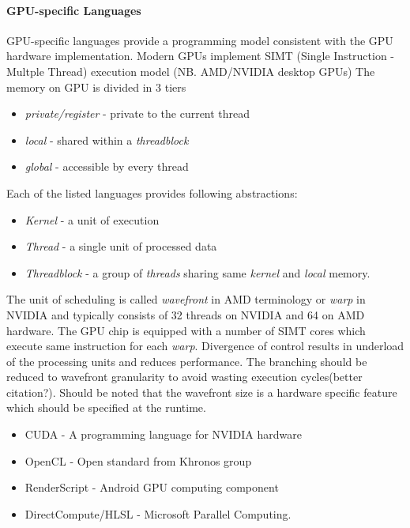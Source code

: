 \documentclass[]{report}
\begin{document}
\paragraph*{GPU-specific Languages}
 GPU-specific languages provide a programming model consistent with the GPU hardware implementation. 
 Modern GPUs implement SIMT (Single Instruction - Multple Thread) execution model (NB. AMD/NVIDIA desktop GPUs) 
 The memory on GPU is divided in 3 tiers 
\begin{itemize}
  	\item \textit{private/register} - private to the current thread
  	\item \textit{local} - shared within a \textit{threadblock}
  	\item \textit{global} - accessible by every thread
\end{itemize}
Each of the listed languages provides following abstractions:
 \begin{itemize}
 	\item \textit{Kernel} - a unit of execution
 	\item \textit{Thread} - a single unit of processed data 
 	\item \textit{Threadblock} - a group of \textit{threads} sharing same \textit{kernel} and \textit{local} memory.
 \end{itemize}

The unit of scheduling is called \textit{wavefront} in AMD terminology or \textit{warp} in NVIDIA and typically consists of 32 threads on NVIDIA and 64 on AMD hardware. The GPU chip is equipped with a number of SIMT cores which execute same instruction for each \textit{warp}. 
Divergence of control results in underload of the processing units and reduces performance. The branching should be reduced to wavefront granularity to avoid wasting execution cycles\cite{megakernel}(better citation?). Should be noted that the wavefront size is a hardware specific feature which should be specified at the runtime.
  
\begin{itemize}
\item CUDA - A programming language for NVIDIA hardware
\item OpenCL - Open standard from Khronos group
\item RenderScript - Android GPU computing component
\item DirectCompute/HLSL - Microsoft Parallel Computing.
\end{itemize}
\end{document}
